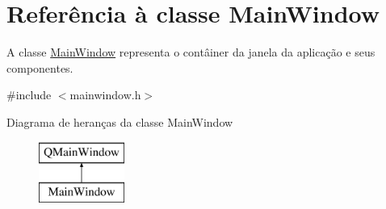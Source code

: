 \hypertarget{class_main_window}{}\section{Referência à classe Main\+Window}
\label{class_main_window}


A classe \hyperlink{class_main_window}{Main\+Window} representa o contâiner da janela da aplicação e seus componentes.  




{\ttfamily \#include $<$mainwindow.\+h$>$}

Diagrama de heranças da classe Main\+Window\begin{figure}[H]
\begin{center}
\leavevmode
\includegraphics[height=2.000000cm]{class_main_window}
\end{center}
\end{figure}
